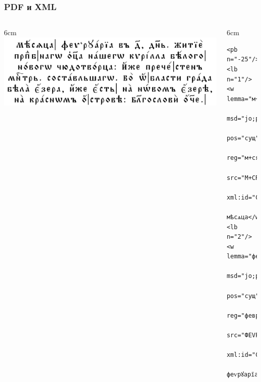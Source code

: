 \documentclass[xetex, aspectratio=169, russian]{beamer}
\begin{document}
\begin{frame}[fragile]
  \frametitle{PDF и XML}

  \begin{columns}[c]
    \begin{column}{6cm}
      \includegraphics[width=\linewidth]{CN_pdf}
    \end{column}

    \begin{column}{6cm}
      \begin{Verbatim}[fontsize=\footnotesize]
<pb n="-25"/>
<lb n="1"/>
<w lemma="м+сяць"
   msd="jo;род;ед;м"
   pos="сущ"
   reg="м+сяца"
   src="М+СRЦА"
   xml:id="CrlNvz.0">
  мѣсѧца</w>
<lb n="2"/>
<w lemma="февруарии"
   msd="jo;род;ед;м"
   pos="сущ"
   reg="февруария"
   src="ФЕVРDАРIА"
   xml:id="CrlNvz.1">
  феѵрꙋарїа</w>
\end{Verbatim}
    \end{column}
  \end{columns}
\end{frame}
\end{document}
